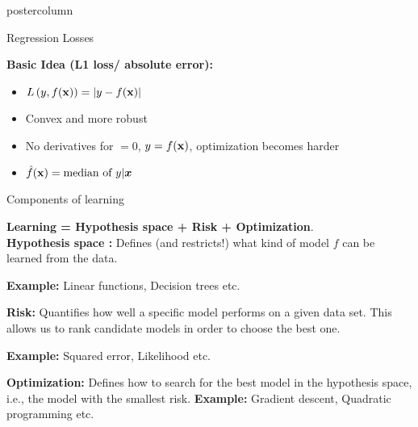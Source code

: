 \documentclass{beamer}
\begin{document}
\begin{frame}[fragile]{}
\begin{columns}
\begin{column}{.31\textwidth}
\begin{beamercolorbox}[center]{postercolumn}
\begin{minipage}{.98\textwidth}
{\begin{myblock}{Regression Losses}
            
              \textbf{Basic Idea (L1 loss/ absolute error):} 
            \begin{itemize}     \setlength{\itemindent}{+.3in}
              \item $L\left(y, f(\mathbf{x})\right) = |y-f(\mathbf{x})|$
              \item Convex and more robust
              \item No derivatives for $ = 0$, $y = f(\mathbf{x})$, optimization becomes harder
              \item $\hat{f}(\mathbf{x}) = \text{median of } y | \bm{x}$      
            \end{itemize}
          \end{myblock}
          \begin{myblock}{Components of learning}
  
            \textbf{Learning = Hypothesis space + Risk  + Optimization}. \\
        
            \textbf{Hypothesis space : } Defines (and restricts!) what kind of model $f$
        can be learned from the data.
            
            \hspace*{1ex} \textbf{Example:} Linear functions, Decision trees etc.
          
          \vspace*{0.5ex}
          
          \textbf{Risk: }Quantifies how well a specific model performs on a given
        data set. This allows us to rank candidate models in order to choose the best one.
        
          \hspace*{1ex} \textbf{Example:} Squared error, Likelihood etc.
          
          \vspace*{0.5ex}
          
          \textbf{Optimization: }Defines how to search for the best model in the hypothesis space, i.e., the model with the smallest {risk}.
          \hspace*{1ex} \textbf{Example:} Gradient descent, Quadratic programming etc.
        
            
          \end{myblock}

}
\end{minipage}
\end{beamercolorbox}
\end{column}
\end{columns}
\end{frame}
\end{document}
